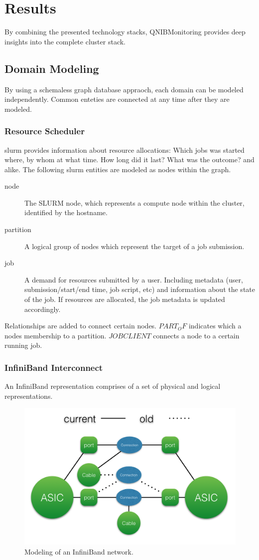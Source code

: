 \section{Results}
By combining the presented technology stacks, QNIBMonitoring provides deep insights into the complete cluster stack.

\subsection{Domain Modeling}
By using a schemaless graph database appraoch, each domain can be modeled independently. Common enteties are connected at any time after
they are modeled.

\subsubsection{Resource Scheduler}
\gls{slurm} provides information about resource allocations: Which jobs was started where, by whom at what time. How long did it last? What was the outcome? and alike.
The following \gls{slurm} entities are modeled as nodes within the graph.
\begin{description}
    \item[node] The SLURM node, which represents a compute node within the cluster, identified by the hostname.
    \item[partition] A logical group of nodes which represent the target of a job submission.
    \item[job] A demand for resources submitted by a user. Including metadata (user, submission/start/end time, job script, etc) and information about the state of the job.
        If resources are allocated, the job metadata is updated accordingly.
\end{description}
Relationships are added to connect certain nodes. $PART_OF$ indicates which a nodes membership to a partition. $JOBCLIENT$ connects a node to a certain running job.

\subsubsection{InfiniBand Interconnect}
An InfiniBand representation comprises of a set of physical and logical representations.
\begin{figure}[!ht]
    \includegraphics[width=.4\textwidth]{images/png/infiniband_graph.png}
    \caption{\label{fig:ib_graph}Modeling of an InfiniBand network.}
\end{figure}

